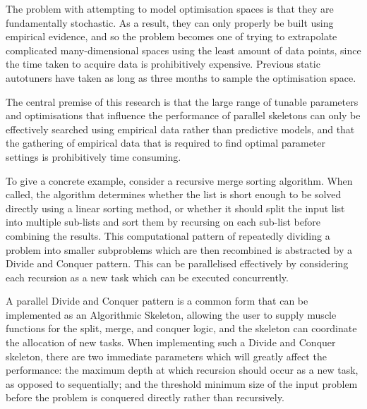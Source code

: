 


The problem with attempting to model optimisation spaces is that they
are fundamentally stochastic. As a result, they can only properly be
built using empirical evidence, and so the problem becomes one of
trying to extrapolate complicated many-dimensional spaces using the
least amount of data points, since the time taken to acquire data is
prohibitively expensive. Previous static autotuners have taken as long
as three months to sample the optimisation space.

The central premise of this research is that the large range of
tunable parameters and optimisations that influence the performance of
parallel skeletons can only be effectively searched using empirical
data rather than predictive models, and that the gathering of
empirical data that is required to find optimal parameter settings is
prohibitively time consuming.

To give a concrete example, consider a recursive merge sorting
algorithm. When called, the algorithm determines whether the list is
short enough to be solved directly using a linear sorting method, or
whether it should split the input list into multiple sub-lists and
sort them by recursing on each sub-list before combining the
results. This computational pattern of repeatedly dividing a problem
into smaller subproblems which are then recombined is abstracted by a
Divide and Conquer pattern. This can be parallelised effectively by
considering each recursion as a new task which can be executed
concurrently.

A parallel Divide and Conquer pattern is a common form that can be
implemented as an Algorithmic Skeleton, allowing the user to supply
muscle functions for the split, merge, and conquer logic, and the
skeleton can coordinate the allocation of new tasks. When implementing
such a Divide and Conquer skeleton, there are two immediate parameters
which will greatly affect the performance: the maximum depth at which
recursion should occur as a new task, as opposed to sequentially; and
the threshold minimum size of the input problem before the problem is
conquered directly rather than recursively.

